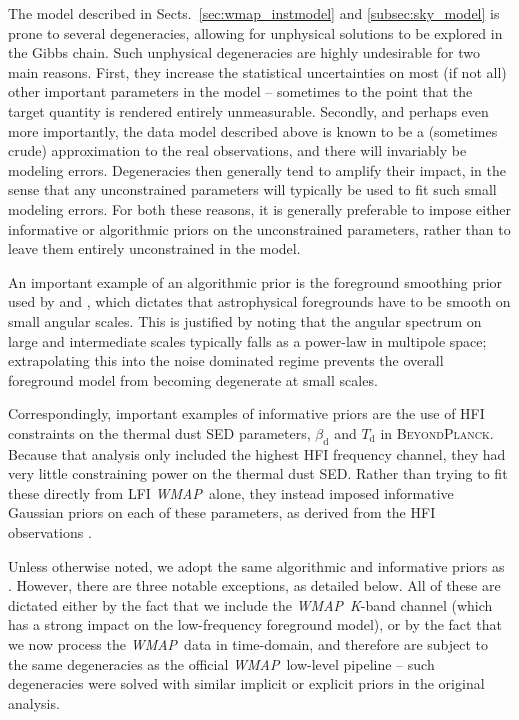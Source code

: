 \documentclass[twocolumn]{../../common/aa}
\def\WMAP{\emph{WMAP}}
\newcommand{\bp}{\textsc{BeyondPlanck}}
\newcommand{\K}[0]{\textit K}
\begin{document}
The model described in Sects.~\ref{sec:wmap_instmodel} and \ref{subsec:sky_model} is prone to several degeneracies, allowing for unphysical solutions to be explored in the Gibbs chain. Such unphysical degeneracies are highly undesirable for two main reasons. First, they increase the statistical uncertainties on most (if not all) other important parameters in the model -- sometimes to the point that the target quantity is rendered entirely unmeasurable. Secondly, and perhaps even more importantly, the data model described above is known to be a (sometimes crude) approximation to the real observations, and there will invariably be modeling errors. Degeneracies then generally tend to amplify their impact, in the sense that any unconstrained parameters will typically be used to fit such small modeling errors. For both these reasons, it is generally preferable to impose either informative or algorithmic priors on the unconstrained parameters, rather than to leave them entirely unconstrained in the model.

An important example of an algorithmic prior is the foreground smoothing prior used by \citet{planck2016-l04} and \citet{bp13}, which dictates that astrophysical foregrounds have to be smooth on small angular scales. This is justified by noting that the angular spectrum on large and intermediate scales typically falls as a power-law in multipole space; extrapolating this into the noise dominated regime prevents the overall foreground model from becoming degenerate at small scales.

Correspondingly, important examples of informative priors are the use of HFI constraints on the thermal dust SED parameters, $\beta_{\mathrm{d}}$ and $T_{\mathrm{d}}$ in \bp. Because that analysis only included the highest HFI frequency channel, they had very little constraining power on the thermal dust SED. Rather than trying to fit these directly from LFI \WMAP\ alone, they instead imposed informative Gaussian priors on each of these parameters, as derived from the HFI observations \citep{planck2016-l04}.

Unless otherwise noted, we adopt the same algorithmic and informative priors as \citet{bp01}. However, there are three notable exceptions, as detailed below. All of these are dictated either by the fact that we include the \WMAP\ \K-band channel (which has a strong impact on the low-frequency foreground model), or by the fact that we now process the \WMAP\ data in time-domain, and therefore are subject to the same degeneracies as the official \WMAP\ low-level pipeline -- such degeneracies  were solved with similar implicit or explicit priors in the original analysis.
\end{document}

